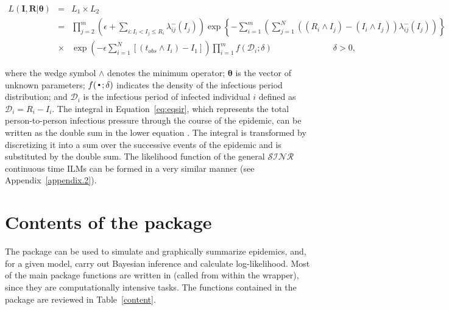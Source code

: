 \documentclass[nojss,shortnames]{jss}
\DeclareMathOperator*{\Bigcdot}{\scalerel*{\cdot}{\bigodot}}
\begin{document}
{\small
\begin{eqnarray}
L(\boldsymbol{I},\boldsymbol{R}|\boldsymbol{\theta}) &=& L_{1} \times L_{2} \nonumber\\
&=& 
\prod_{j=2}^{m}{\left(\epsilon +\sum_{i:I_{i} < I_{j} \leq R_{i}}{\lambda_{ij}^{-}(I_{j})}\right)}   \exp \left\{ -\sum_{i=1}^{m}{\left(\sum_{j=1}^{N}{( (R_{i} \wedge I_{j}) - (I_{i} \wedge I_{j})) \lambda_{ij}^{-}(I_{j})}\right)} \right\}  \nonumber \\
&\times& \exp \left(- \epsilon \sum_{i=1}^{N}{\left[(t_{obs} \wedge I_{i}) - I_{1}\right]} \right) \prod_{i=1}^{m}{f(\mathcal{D}_{i};\delta)} \hspace{3cm} \delta > 0,
	 \label{eq:eqsir}
\end{eqnarray}
}


\noindent where the wedge symbol $\wedge$ denotes the minimum operator; $\boldsymbol{\theta}$ is the vector of unknown parameters; $f(\Bigcdot;\delta)$ indicates the density of the infectious period distribution; and $\mathcal{D}_{i}$ is the infectious period of infected individual $i$ defined as $\mathcal{D}_{i}= R_{i}-I_{i}$. The integral in Equation~\ref{eq:eqsir}, which represents the total person-to-person infectious pressure through the course of the epidemic, can be written as the double sum in the lower equation \citep{britton2002bayesian,jewell2009bayesian}. The integral is transformed by discretizing it into a sum over the successive events of the epidemic and is substituted by the double sum. The likelihood function of the general $\mathcal{SINR}$ continuous time ILMs can be formed in a very similar manner (see Appendix~\ref{appendix.2}). 

\section[Contents of the EpiILMCT package]{Contents of the  package}

The  package can be used to simulate and graphically summarize epidemics, and, for a given model, carry out Bayesian inference and calculate log-likelihood. Most of the main package functions are written in  (called from within the  wrapper), since they are computationally intensive tasks. The functions contained in the package are reviewed in Table~\ref{content}. 
\end{document}

